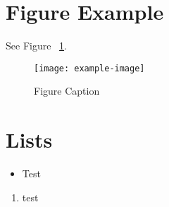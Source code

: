 \documentclass{jdf}
\begin{document}
\section*{Figure Example}
See Figure ~\ref{fig::1}.
\begin{figure}[H]
\centering
\texttt{[image: example-image]}
\caption{Figure Caption}
\label{fig::1}
\end{figure}

\section*{Lists}
\begin{itemize}[leftmargin=.5in]
\item Test
\end{itemize}

\begin{enumerate}[leftmargin=.5in]
\item test \cite{test}
\end{enumerate}



\end{document}
